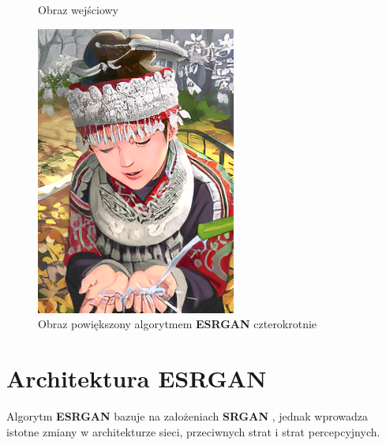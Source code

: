 \begin{figure}[ht]
\begin{minipage}[t]{0.4\linewidth}
        \caption{Obraz wejściowy}
        \label{fig:image60}
    \end{minipage}
    \hspace{0.5cm}
    \begin{minipage}[t]{0.4\linewidth}
        \includegraphics[width=\linewidth]{Rozdziały/02.Podstawy_teoretyczne/Obrazy/comic_ESRGAN_x4.png}
        \caption{Obraz powiększony algorytmem \textbf{ESRGAN} czterokrotnie}
        \label{fig:image61}
    \end{minipage}
\end{figure}

\newpage
\section{Architektura ESRGAN}

Algorytm \textbf{ESRGAN} bazuje na założeniach \textbf{SRGAN} \cite{Ledig_2017_CVPR}, jednak wprowadza istotne zmiany w architekturze sieci, przeciwnych strat i strat percepcyjnych.

